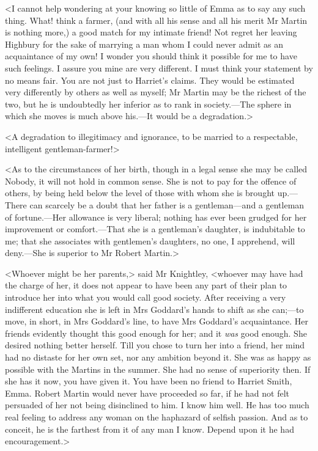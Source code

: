 <I cannot help wondering at your knowing so little of Emma as to say any such thing. What! think a farmer, (and with all his sense and all his merit Mr Martin is nothing more,) a good match for my intimate friend! Not regret her leaving Highbury for the sake of marrying a man whom I could never admit as an acquaintance of my own! I wonder you should think it possible for me to have such feelings. I assure you mine are very different. I must think your statement by no means fair. You are not just to Harriet's claims. They would be estimated very differently by others as well as myself; Mr Martin may be the richest of the two, but he is undoubtedly her inferior as to rank in society.—The sphere in which she moves is much above his.—It would be a degradation.>

<A degradation to illegitimacy and ignorance, to be married to a respectable, intelligent gentleman-farmer!>

<As to the circumstances of her birth, though in a legal sense she may be called Nobody, it will not hold in common sense. She is not to pay for the offence of others, by being held below the level of those with whom she is brought up.—There can scarcely be a doubt that her father is a gentleman—and a gentleman of fortune.—Her allowance is very liberal; nothing has ever been grudged for her improvement or comfort.—That she is a gentleman's daughter, is indubitable to me; that she associates with gentlemen's daughters, no one, I apprehend, will deny.—She is superior to Mr Robert Martin.>

<Whoever might be her parents,> said Mr Knightley, <whoever may have had the charge of her, it does not appear to have been any part of their plan to introduce her into what you would call good society. After receiving a very indifferent education she is left in Mrs Goddard's hands to shift as she can;—to move, in short, in Mrs Goddard's line, to have Mrs Goddard's acquaintance. Her friends evidently thought this good enough for her; and it \textit{was} good enough. She desired nothing better herself. Till you chose to turn her into a friend, her mind had no distaste for her own set, nor any ambition beyond it. She was as happy as possible with the Martins in the summer. She had no sense of superiority then. If she has it now, you have given it. You have been no friend to Harriet Smith, Emma. Robert Martin would never have proceeded so far, if he had not felt persuaded of her not being disinclined to him. I know him well. He has too much real feeling to address any woman on the haphazard of selfish passion. And as to conceit, he is the farthest from it of any man I know. Depend upon it he had encouragement.>

